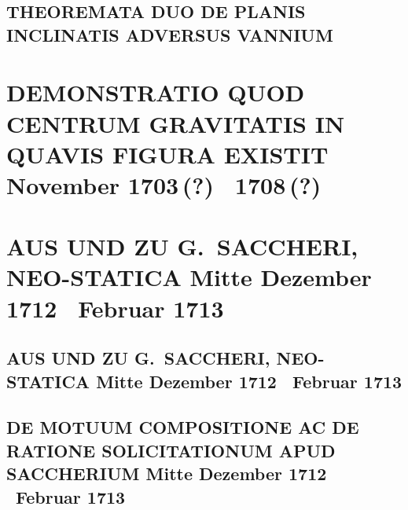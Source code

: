 \documentclass[%
fontsize=10pt,
]{scrbook}
\DeclareRobustCommand{\bracks}[1]{%
\textup{\lbrack}#1\textup{\rbrack}}
\begin{document}
\section[tocentry={Theoremata duo de planis inclinatis adversus Vannium},
head={Theoremata duo de planis inclinatis adversus Vannium}]
{\MakeUppercase{Theoremata duo de planis inclinatis adversus Vannium}}
\label{60100}






\chapter[tocentry={Demonstratio quod centrum gravitatis in quavis figura existit
\enskip \bracks{November 1703\,(?) \textendash\ 1708\,(?)}
},
head={Demonstratio quod centrum gravitatis in quavis figura existit}]%
{\MakeUppercase{Demonstratio quod centrum gravitatis in quavis figura existit}
\newline \bracks{November 1703\,(?) \textendash\ 1708\,(?)}
}

\label{58942}





\chapter[tocentry={Aus und zu G.~Saccheri, Neo-statica
\enskip \bracks{Mitte Dezember 1712 \textendash\ Februar 1713}},
head={Aus und zu Saccheri, Neo-statica}]
{\MakeUppercase{Aus und zu G.~Saccheri, Neo-statica}
\newline \bracks{Mitte Dezember 1712 \textendash\ Februar 1713}}
\label{intro_saccheri}

\section[tocentry={Aus und zu G.~Saccheri, Neo-statica
\enskip \bracks{Mitte Dezember 1712 \textendash\ Februar 1713}%
},
head={Aus und zu Saccheri, Neo-statica}]
{\MakeUppercase{Aus und zu G.~Saccheri, Neo-statica}
\newline \bracks{Mitte Dezember 1712 \textendash\ Februar 1713}%
}
\label{60123}

\section[tocentry={De motuum compositione ac de ratione solicitationum apud Saccherium
\enskip \bracks{Mitte Dezember 1712 \textendash\ Februar 1713}%
},
head={De motuum compositione ac de ratione solicitationum}]
{\MakeUppercase{De motuum compositione ac de ratione solicitationum apud Saccherium}
\newline \bracks{Mitte Dezember 1712 \textendash\ Februar 1713}%
}
\label{60124}

\end{document}
